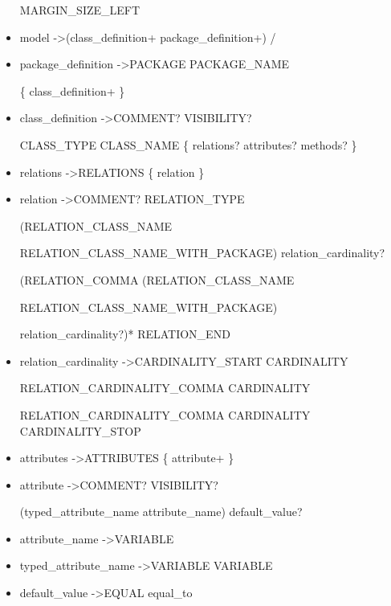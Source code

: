 \begin{itemize}
 MARGIN{\_}SIZE{\_}LEFT

 \item model   -\textgreater   (class{\_}definition+   \textbar   package{\_}definition+)  /

 \item package{\_}definition   -\textgreater   PACKAGE  PACKAGE{\_}NAME  

 \{  class{\_}definition+  \}

 \item class{\_}definition   -\textgreater   COMMENT?  VISIBILITY?  
 
 CLASS{\_}TYPE  CLASS{\_}NAME  \{  relations?  attributes?  methods?  \}

 \item relations   -\textgreater   RELATIONS  \{  relation  \}

 \item relation   -\textgreater   COMMENT?  RELATION{\_}TYPE  
 
 (RELATION{\_}CLASS{\_}NAME 
 
 \textbar RELATION{\_}CLASS{\_}NAME{\_}WITH{\_}PACKAGE)  relation{\_}cardinality?  
 
 (RELATION{\_}COMMA  (RELATION{\_}CLASS{\_}NAME 
 
 \textbar RELATION{\_}CLASS{\_}NAME{\_}WITH{\_}PACKAGE)  
 
 relation{\_}cardinality?)*  RELATION{\_}END

 \item relation{\_}cardinality   -\textgreater   CARDINALITY{\_}START  CARDINALITY  
 
 RELATION{\_}CARDINALITY{\_}COMMA   CARDINALITY 
 
 RELATION{\_}CARDINALITY{\_}COMMA  CARDINALITY  CARDINALITY{\_}STOP

 \item attributes   -\textgreater   ATTRIBUTES  \{  attribute+  \}

 \item attribute   -\textgreater   COMMENT?  VISIBILITY?  
 
 (typed{\_}attribute{\_}name \textbar attribute{\_}name)  default{\_}value?

 \item attribute{\_}name   -\textgreater   VARIABLE

 \item typed{\_}attribute{\_}name   -\textgreater   VARIABLE  VARIABLE

 \item default{\_}value   -\textgreater   EQUAL  equal{\_}to


\end{itemize}
